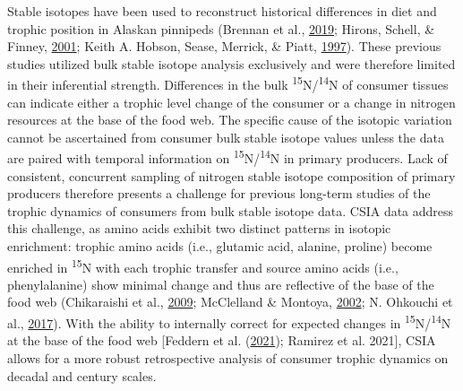 \documentclass [11pt, proquest] {uwthesis}[2015/03/03]
\begin{document}
Stable isotopes have been used to reconstruct historical differences in
diet and trophic position in Alaskan pinnipeds (Brennan et al.,
\protect\hyperlink{ref-Brennan2019}{2019}; Hirons, Schell, \& Finney,
\protect\hyperlink{ref-Hirons2001}{2001}; Keith A. Hobson, Sease,
Merrick, \& Piatt, \protect\hyperlink{ref-Hobson1997}{1997}). These
previous studies utilized bulk stable isotope analysis exclusively and
were therefore limited in their inferential strength. Differences in the
bulk \textsuperscript{15}N/\textsuperscript{14}N of consumer tissues can
indicate either a trophic level change of the consumer or a change in
nitrogen resources at the base of the food web. The specific cause of
the isotopic variation cannot be ascertained from consumer bulk stable
isotope values unless the data are paired with temporal information on
\textsuperscript{15}N/\textsuperscript{14}N in primary producers. Lack
of consistent, concurrent sampling of nitrogen stable isotope
composition of primary producers therefore presents a challenge for
previous long-term studies of the trophic dynamics of consumers from
bulk stable isotope data. CSIA data address this challenge, as amino
acids exhibit two distinct patterns in isotopic enrichment: trophic
amino acids (i.e., glutamic acid, alanine, proline) become enriched in
\textsuperscript{15}N with each trophic transfer and source amino acids
(i.e., phenylalanine) show minimal change and thus are reflective of the
base of the food web (Chikaraishi et al.,
\protect\hyperlink{ref-Chikaraishi2009}{2009}; McClelland \& Montoya,
\protect\hyperlink{ref-McClelland2002}{2002}; N. Ohkouchi et al.,
\protect\hyperlink{ref-Ohkouchi2017}{2017}). With the ability to
internally correct for expected changes in
\textsuperscript{15}N/\textsuperscript{14}N at the base of the food web
{[}Feddern et al. (\protect\hyperlink{ref-Feddern2021}{2021}); Ramirez
et al. 2021{]}, CSIA allows for a more robust retrospective analysis of
consumer trophic dynamics on decadal and century scales.
\end{document}
